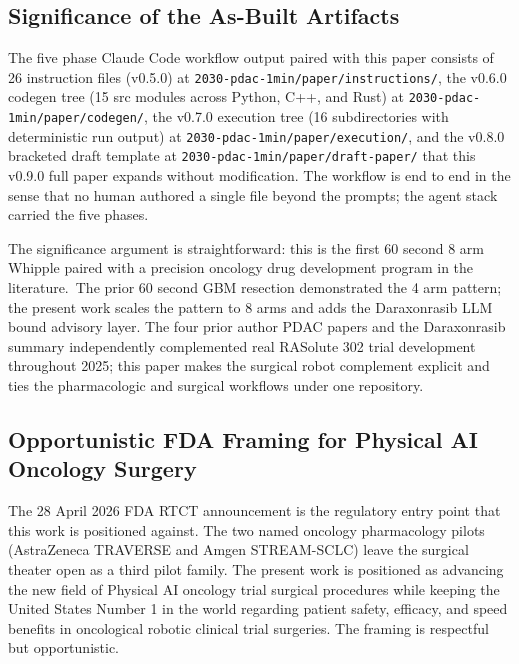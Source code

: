 
\subsection{Significance of the As-Built Artifacts}
\label{sec:discussion-significance}

The five phase Claude Code workflow output paired with this paper
consists of 26 instruction files (v0.5.0) at
\texttt{2030-pdac-1min/paper/instructions/}, the v0.6.0 codegen
tree (15 src modules across Python, C++, and Rust) at
\texttt{2030-pdac-1min/paper/codegen/}, the v0.7.0 execution tree
(16 subdirectories with deterministic run output) at
\texttt{2030-pdac-1min/paper/execution/}, and the v0.8.0 bracketed
draft template at \texttt{2030-pdac-1min/paper/draft-paper/} that
this v0.9.0 full paper expands without modification. The workflow
is end to end in the sense that no human authored a single file
beyond the prompts; the agent stack \cite{claude-code,
claude-opus-47, claude-sonnet-46} carried the five phases.

The significance argument is straightforward: this is the first 60
second 8 arm Whipple paired with a precision oncology drug
development program in the literature.\ The prior 60 second GBM
resection \cite{kawchak_2026_20113157} demonstrated the 4 arm
pattern; the present work scales the pattern to 8 arms and adds
the Daraxonrasib LLM bound advisory layer. The four prior author
PDAC papers \cite{kawchak_2025_15735068, kawchak_2025_16415815,
kawchak_2025_17001137, kawchak_2025_17239510} and the Daraxonrasib
summary \cite{kawchak_2025_18099351} independently complemented
real RASolute 302 trial development throughout 2025; this paper
makes the surgical robot complement explicit and ties the
pharmacologic and surgical workflows under one repository.

\subsection{Opportunistic FDA Framing for Physical AI Oncology Surgery}
\label{sec:discussion-fda}

The 28 April 2026 FDA RTCT announcement \cite{fda2026realtime} is
the regulatory entry point that this work is positioned against.
The two named oncology pharmacology pilots (AstraZeneca TRAVERSE
and Amgen STREAM-SCLC) leave the surgical theater open as a third
pilot family. The present work is positioned as advancing the new
field of Physical AI oncology trial surgical procedures while
keeping the United States Number 1 in the world regarding patient
safety, efficacy, and speed benefits in oncological robotic
clinical trial surgeries. The framing is respectful but
opportunistic.

